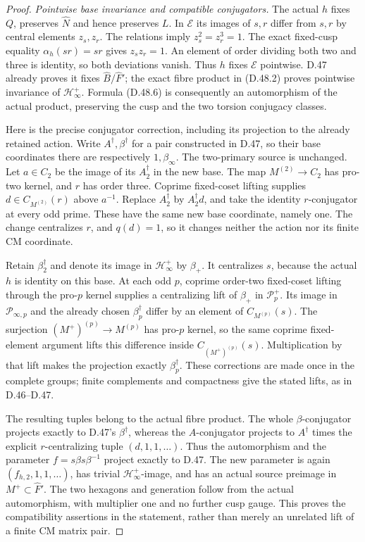 \begin{proof}
\emph{Pointwise base invariance and compatible conjugators.}
The actual \(h\) fixes \(Q\), preserves \(\widehat N\)
and hence preserves \(L\). In \(\mathcal E\) its images
of \(s,r\) differ from \(s,r\) by central elements
\(z_s,z_r\). The relations imply \(z_s^2=z_r^3=1\).
The exact fixed-cusp equality \(\alpha_h(sr)=sr\) gives
\(z_sz_r=1\). An element of order dividing both two and
three is identity, so both deviations vanish. Thus \(h\)
fixes \(\mathcal E\) pointwise. D.47 already proves it
fixes \(\widehat B/\widehat F'\); the exact fibre product
in (D.48.2) proves pointwise invariance of
\(\mathcal H^+_\infty\). Formula (D.48.6) is consequently
an automorphism of the actual product, preserving the
cusp and the two torsion conjugacy classes.

Here is the precise conjugator correction, including its
projection to the already retained action. Write
\(A^\dagger,\beta^\dagger\) for a pair constructed in
D.47, so their base coordinates there are respectively
\(1,\beta_\infty\). The two-primary source is unchanged.
Let \(a\in C_2\) be the image of its
\(A^\dagger_2\) in the new base. The map
\(M^{(2)}\to C_2\) has pro-two kernel, and \(r\)
has order three. Coprime fixed-coset lifting supplies
\(d\in C_{M^{(2)}}(r)\) above \(a^{-1}\).
Replace \(A^\dagger_2\) by \(A^\dagger_2d\), and
take the identity \(r\)-conjugator at every odd prime.
These have the same new base coordinate, namely one.
The change centralizes \(r\), and \(q(d)=1\), so it
changes neither the action nor its finite CM coordinate.

Retain \(\beta^\dagger_2\) and denote its image in
\(\mathcal H^+_\infty\) by \(\beta_+\).
It centralizes \(s\), because the actual \(h\) is
identity on this base. At each odd \(p\), coprime
order-two fixed-coset lifting through the pro-\(p\)
kernel supplies a centralizing lift of \(\beta_+\)
in \(\mathcal P_p^+\). Its image in
\(\mathcal P_{\infty,p}\) and the already chosen
\(\beta^\dagger_p\) differ by an element of
\(C_{M^{(p)}}(s)\). The surjection
\((M^+)^{(p)}\to M^{(p)}\) has pro-\(p\) kernel,
so the same coprime fixed-element argument lifts this
difference inside \(C_{(M^+)^{(p)}}(s)\). Multiplication
by that lift makes the projection exactly
\(\beta^\dagger_p\). These corrections are made once
in the complete groups; finite complements and compactness
give the stated lifts, as in D.46--D.47.

The resulting tuples belong to the actual fibre product.
The whole \(\beta\)-conjugator projects exactly to
D.47's \(\beta^\dagger\), whereas the \(A\)-conjugator
projects to \(A^\dagger\) times the explicit
\(r\)-centralizing tuple \((d,1,1,\ldots)\).
Thus the automorphism and the parameter
\(f=s\beta s\beta^{-1}\) project exactly to D.47.
The new parameter is again \((f_{h,2},1,1,\ldots)\),
has trivial \(\mathcal H^+_\infty\)-image, and has
an actual source preimage in \(M^+\subset\widehat F'\).
The two hexagons and generation follow from the actual
automorphism, with multiplier one and no further cusp
gauge. This proves the compatibility assertions in the
statement, rather than merely an unrelated lift of a
finite CM matrix pair.


\end{proof}
